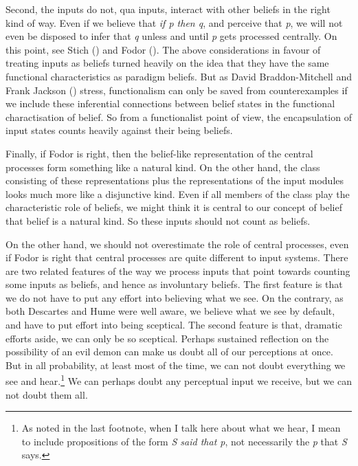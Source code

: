 \documentclass[
  10pt,
  letterpaper,
  DIV=11,
  numbers=noendperiod,
  twoside]{scrartcl}
\begin{document}
Second, the inputs do not, qua inputs, interact with other beliefs in
the right kind of way. Even if we believe that \emph{if p then q}, and
perceive that \emph{p}, we will not even be disposed to infer that
\emph{q} unless and until \emph{p} gets processed centrally. On this
point, see Stich () and Fodor
(). The above considerations in
favour of treating inputs as beliefs turned heavily on the idea that
they have the same functional characteristics as paradigm beliefs. But
as David Braddon-Mitchell and Frank Jackson
() stress, functionalism can
only be saved from counterexamples if we include these inferential
connections between belief states in the functional charactisation of
belief. So from a functionalist point of view, the encapsulation of
input states counts heavily against their being beliefs.

Finally, if Fodor is right, then the belief-like representation of the
central processes form something like a natural kind. On the other hand,
the class consisting of these representations plus the representations
of the input modules looks much more like a disjunctive kind. Even if
all members of the class play the characteristic role of beliefs, we
might think it is central to our concept of belief that belief is a
natural kind. So these inputs should not count as beliefs.

On the other hand, we should not overestimate the role of central
processes, even if Fodor is right that central processes are quite
different to input systems. There are two related features of the way we
process inputs that point towards counting some inputs as beliefs, and
hence as involuntary beliefs. The first feature is that we do not have
to put any effort into believing what we see. On the contrary, as both
Descartes and Hume were well aware, we believe what we see by default,
and have to put effort into being sceptical. The second feature is that,
dramatic efforts aside, we can only be so sceptical. Perhaps sustained
reflection on the possibility of an evil demon can make us doubt all of
our perceptions at once. But in all probability, at least most of the
time, we can not doubt everything we see and hear.\footnote{As noted in
  the last footnote, when I talk here about what we hear, I mean to
  include propositions of the form \emph{S said that p}, not necessarily
  the \emph{p} that \emph{S} says.} We can perhaps doubt any perceptual
input we receive, but we can not doubt them all.
\end{document}
